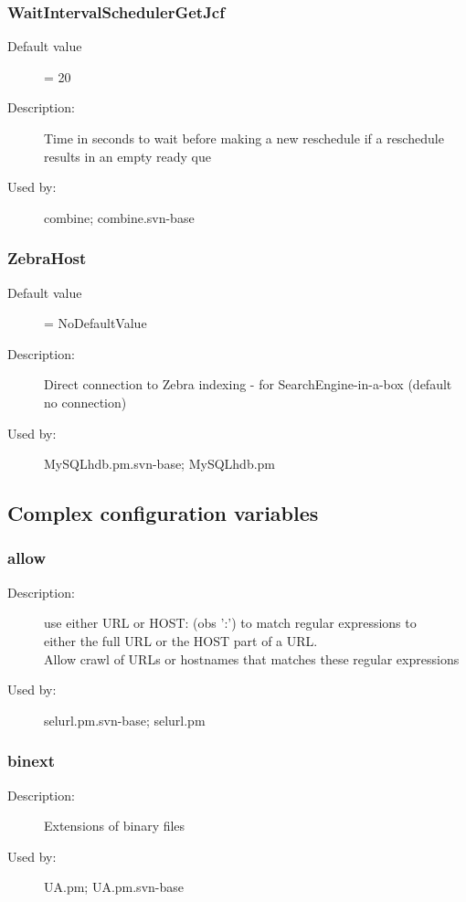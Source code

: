 \subsubsection{WaitIntervalSchedulerGetJcf}
\label{WaitIntervalSchedulerGetJcf}
\begin{description}
\item[Default value] = 20
\item[Description:] Time in seconds to wait before making a new reschedule if a reschedule results in an empty ready que
\item[Used by:] combine; combine.svn-base
\end{description}
\subsubsection{ZebraHost}
\label{ZebraHost}
\begin{description}
\item[Default value] = NoDefaultValue
\item[Description:] Direct connection to Zebra indexing - for SearchEngine-in-a-box (default no connection)
\item[Used by:] MySQLhdb.pm.svn-base; MySQLhdb.pm
\end{description}
\subsection{Complex configuration variables}
\subsubsection{allow}
\label{allow}
\begin{description}
\item[Description:] use either URL or HOST: (obs ':') to match regular expressions to \\  either the full URL or the HOST part of a URL. \\ Allow crawl of URLs or hostnames that matches these regular expressions
\item[Used by:] selurl.pm.svn-base; selurl.pm
\end{description}
\subsubsection{binext}
\label{binext}
\begin{description}
\item[Description:] Extensions of binary files
\item[Used by:] UA.pm; UA.pm.svn-base
\end{description}
